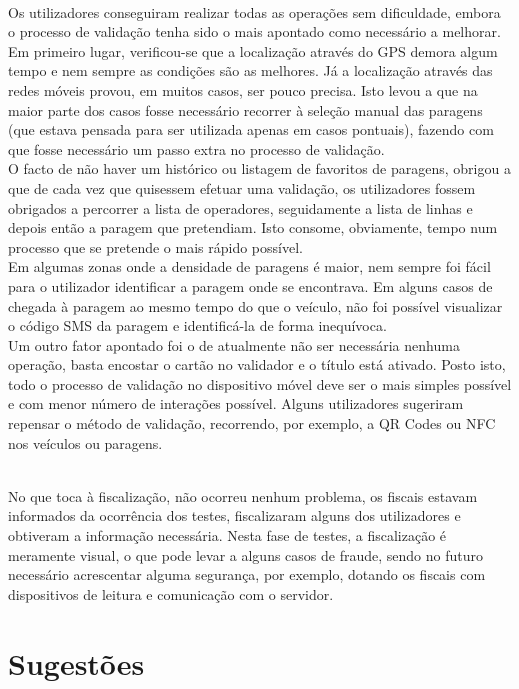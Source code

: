 ~\\Os utilizadores conseguiram realizar todas as operações sem dificuldade, embora o processo de validação tenha sido o mais apontado como necessário a melhorar. 
\\Em primeiro lugar, verificou-se que a localização através do GPS demora algum tempo e nem sempre as condições são as melhores. Já a localização através das redes móveis provou, em muitos casos, ser pouco precisa. Isto levou a que na maior parte dos casos fosse necessário recorrer à seleção manual das paragens (que estava pensada para ser utilizada apenas em casos pontuais), fazendo com que fosse necessário um passo extra no processo de validação.
\\O facto de não haver um histórico ou listagem de favoritos de paragens, obrigou a que de cada vez que quisessem efetuar uma validação, os utilizadores fossem obrigados a percorrer a lista de operadores, seguidamente a lista de linhas e depois então a paragem que pretendiam. Isto consome, obviamente, tempo num processo que se pretende o mais rápido possível.
\\Em algumas zonas onde a densidade de paragens é maior, nem sempre foi fácil para o utilizador identificar a paragem onde se encontrava. Em alguns casos de chegada à paragem ao mesmo tempo do que o veículo, não foi possível visualizar o código SMS da paragem e identificá-la de forma inequívoca.
\\Um outro fator apontado foi o de atualmente não ser necessária nenhuma operação, basta encostar o cartão no validador e o título está ativado. Posto isto, todo o processo de validação no dispositivo móvel deve ser o mais simples possível e com menor número de interações possível. Alguns utilizadores sugeriram repensar o método de validação, recorrendo, por exemplo, a QR Codes ou NFC nos veículos ou paragens.

~\\No que toca à fiscalização, não ocorreu nenhum problema, os fiscais estavam informados da ocorrência dos testes, fiscalizaram alguns dos utilizadores e obtiveram a informação necessária. Nesta fase de testes, a fiscalização é meramente visual, o que pode levar a alguns casos de fraude, sendo no futuro necessário acrescentar alguma segurança, por exemplo, dotando os fiscais com dispositivos de leitura e comunicação com o servidor.

\section{Sugestões}
\label{sec:sugestoes}

